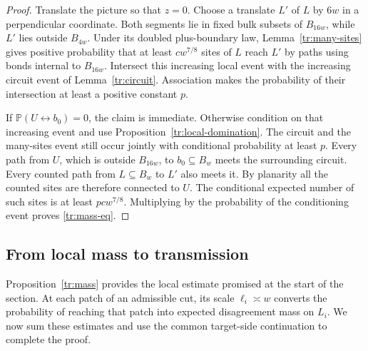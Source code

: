\documentclass[11pt]{article}
\theoremstyle{definition}
\theoremstyle{remark}
\numberwithin{equation}{section}
\begin{document}
\begin{proof}
Translate the picture so that $z=0$. Choose a translate $L'$ of $L$
by $6w$ in a perpendicular coordinate. Both segments lie in fixed bulk
subsets of $B_{16w}$, while $L'$ lies outside $B_{4w}$. Under its doubled
plus-boundary law, Lemma~\ref{tr:many-sites} gives positive probability
that at least $c w^{7/8}$ sites of $L$ reach $L'$ by paths using bonds
internal to $B_{16w}$. Intersect this increasing local event with the
increasing circuit event of Lemma~\ref{tr:circuit}.
Association makes the probability of their intersection at least a
positive constant $p$.

If $\mathbb P(U\longleftrightarrow b_0)=0$, the claim is immediate.
Otherwise condition on that increasing event and use
Proposition~\ref{tr:local-domination}. The circuit and the many-sites
event still occur jointly with conditional probability at least $p$.
Every path from $U$, which is outside $B_{16w}$, to $b_0\subseteq B_w$
meets the surrounding circuit. Every counted path from $L\subseteq B_w$
to $L'$ also meets it. By planarity all the counted sites are therefore
connected to $U$. The conditional expected number of such sites is at
least $pc w^{7/8}$. Multiplying by the probability of the conditioning
event proves \eqref{tr:mass-eq}.
\end{proof}

\subsection{From local mass to transmission}
\label{tr:transmission-subsection}

Proposition~\ref{tr:mass} provides the local estimate promised at the
start of the section. At each patch of an admissible cut, its scale
$\ell_i\asymp w$ converts the probability of reaching that patch into
expected disagreement mass on $L_i$. We now sum these estimates and
use the common target-side continuation to complete the proof.
\end{document}
